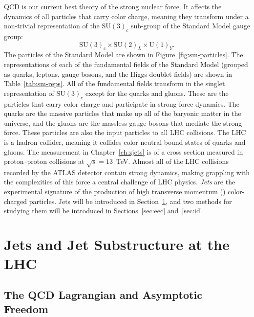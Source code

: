 QCD is our current best theory of the strong nuclear force.
It affects the dynamics of all particles that carry color charge, meaning they transform under a non-trivial representation of the $\mathrm{SU}(3)_c$ sub-group of the Standard Model gauge group:
\begin{equation}
  \mathrm{SU}(3)_c \times \mathrm{SU}(2)_L \times \mathrm{U}(1)_Y.
  \label{eqn:sm_gauge_group}
\end{equation}
The particles of the Standard Model are shown in Figure~\ref{fig:sm-particles}.
The representations of each of the fundamental fields of the Standard Model (grouped as quarks, leptons, gauge bosons, and the Higgs doublet fields) are shown in Table~\ref{tab:sm-reps}.
All of the fundamental fields transform in the singlet representation of $\mathrm{SU}(3)_c$ except for the quarks and gluons.
These are the particles that carry color charge and participate in strong-force dynamics.
The quarks are the massive particles that make up all of the baryonic matter in the universe, and the gluons are the massless gauge bosons that mediate the strong force.
These particles are also the input particles to all LHC collisions.
The LHC is a hadron collider, meaning it collides color neutral bound states of quarks and gluons.
The measurement in Chapter~\ref{ch:zjets} is of a cross section measured in proton--proton collisions at $\sqrt{s} = 13$~TeV.
Almost all of the LHC collisions recorded by the ATLAS detector contain strong dynamics, making grappling with the complexities of this force a central challenge of LHC physics.
\textit{Jets} are the experimental signature of the production of high transverse momentum (\pt) color-charged particles.
Jets will be introduced in Section~\ref{sec:jets}, and two methods for studying them will be introduced in Sections~\ref{sec:eec} and~\ref{sec:id}.

\section{Jets and Jet Substructure at the LHC}
\label{sec:jets}

\subsection{The QCD Lagrangian and Asymptotic Freedom}


